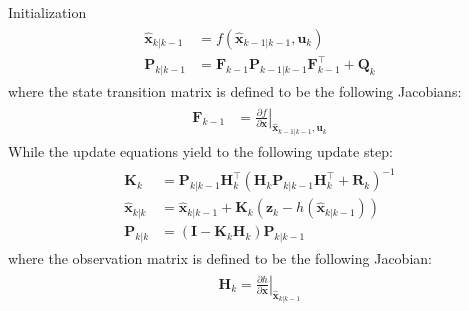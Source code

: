 Initialization
\begin{align}
\begin{split}
\boldsymbol{\hat{x}}_{k|k-1} &= f(\boldsymbol{\hat{x}}_{k-1|k-1},\boldsymbol{u}_k) \\[10pt]
\boldsymbol{P}_{k|k-1} &= \boldsymbol{F}_{k-1} \boldsymbol{P}_{k-1|k-1}\boldsymbol{F}_{k-1}^{\top } + \boldsymbol{Q}_{k}
\end{split}
\end{align}
where the state transition matrix is defined to be the following Jacobians:
\begin{align}
\begin{split}
\boldsymbol{F}_{k-1}&= \left.{\frac{\partial f}{\partial {\boldsymbol{x}}}} \right \vert_{\hat{\boldsymbol{x}}_{k-1|k-1},\boldsymbol{u}_{k}} 
\end{split}
\end{align}
While the update equations yield to the following update step: 
\begin{align}
\begin{split}
\boldsymbol{K}_{k} &= \boldsymbol{P}_{k|k-1} \boldsymbol{H}_{k}^{\top }(\boldsymbol{H}_{k} \boldsymbol{P}_{k|k-1} \boldsymbol{H}_{k}^{\top }+ \boldsymbol{R}_{k})^{-1}
\\[10pt]
\hat{\boldsymbol{x}}_{k|k} &= \hat{\boldsymbol{x}}_{k|k-1} + \boldsymbol{K}_{k} (\boldsymbol{z}_{k}-h(\hat{\boldsymbol{x}}_{k|k-1}))
\\[10pt]
\boldsymbol{P}_{k|k} &=(\boldsymbol{I}-\boldsymbol{K}_{k}\boldsymbol{H}_{k})\boldsymbol{P}_{k|k-1}
\end{split}
\end{align}
where the observation matrix is defined to be the following Jacobian:
\begin{align}
\begin{split}
\boldsymbol{H}_{k} = \left.{\frac{\partial h}{\partial {\boldsymbol{x}}}} \right \vert_{\hat{\boldsymbol{x}}_{k|k-1}}
\end{split}
\end{align}

